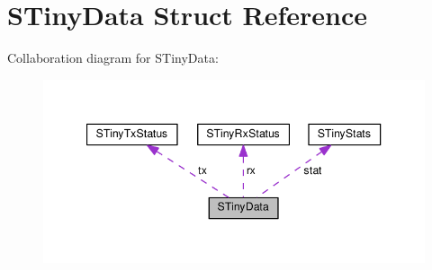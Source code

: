 \hypertarget{structSTinyData}{}\section{S\+Tiny\+Data Struct Reference}
\label{structSTinyData}


Collaboration diagram for S\+Tiny\+Data\+:
\nopagebreak
\begin{figure}[H]
\begin{center}
\leavevmode
\includegraphics[width=347pt]{structSTinyData__coll__graph}
\end{center}
\end{figure}
